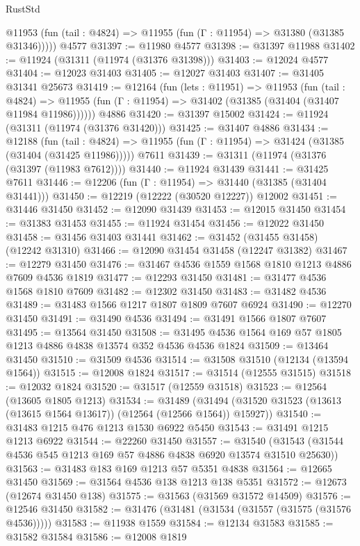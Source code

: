 \begin{lexlean}{RustStd}
\begin{coremodule}
{\begin{coremodule}
{{{{{{{{{{{{{{{{{{{{{{{{{{{{{{{{{{{{{{{{{{{{{{{{{{{{{{{{{{{{{{{{{{{{{{{{{{{{{{{{      @11953 (fun (tail : @4824) => @11955 (fun (Γ : @11954) => @31380 (@31385 @31346)))))
    @4577
@31397 := @11980 @4577
@31398 := @31397 @11988
@31402 := @11924 (@31311 (@11974 (@31376 @31398)))
@31403 := @12024 @4577
@31404 := @12023 @31403
@31405 := @12027 @31403
@31407 := @31405 @31341 @25673
@31419 := @12164
    (fun (lets : @11951) =>
    @11953
      (fun (tail : @4824) =>
      @11955 (fun (Γ : @11954) => @31402 (@31385 (@31404 (@31407 @11984 @11986))))))
    @4886
@31420 := @31397 @15002
@31424 := @11924 (@31311 (@11974 (@31376 @31420)))
@31425 := @31407 @4886
@31434 := @12188
    (fun (tail : @4824) => @11955 (fun (Γ : @11954) => @31424 (@31385 (@31404 (@31425 @11986)))))
    @7611
@31439 := @31311 (@11974 (@31376 (@31397 (@11983 @7612))))
@31440 := @11924 @31439
@31441 := @31425 @7611
@31446 := @12206 (fun (Γ : @11954) => @31440 (@31385 (@31404 @31441)))
@31450 := @12219 (@12222 (@30520 @12227)) @12002
@31451 := @31446 @31450
@31452 := @12090 @31439
@31453 := @12015 @31450
@31454 := @31383 @31453
@31455 := @11924 @31454
@31456 := @12022 @31450
@31458 := @31456 @31403 @31441
@31462 := @31452 (@31455 @31458) (@12242 @31310)
@31466 := @12090 @31454 @31458 (@12247 @31382)
@31467 := @12279 @31450
@31476 := @31467 @4536 @1559 @1568 @1810 @1213 @4886 @7609 @4536 @1819
@31477 := @12293 @31450
@31481 := @31477 @4536 @1568 @1810 @7609
@31482 := @12302 @31450
@31483 := @31482 @4536
@31489 := @31483 @1566 @1217 @1807 @1809 @7607 @6924
@31490 := @12270 @31450
@31491 := @31490 @4536
@31494 := @31491 @1566 @1807 @7607
@31495 := @13564 @31450
@31508 := @31495 @4536 @1564 @169 @57 @1805 @1213 @4886 @4838 @13574 @352 @4536 @4536 @1824
@31509 := @13464 @31450
@31510 := @31509 @4536
@31514 := @31508 @31510 (@12134 (@13594 @1564))
@31515 := @12008 @1824
@31517 := @31514 (@12555 @31515)
@31518 := @12032 @1824
@31520 := @31517 (@12559 @31518)
@31523 := @12564 (@13605 @1805 @1213)
@31534 := @31489
    (@31494 (@31520 @31523 (@13613 (@13615 @1564 @13617)) (@12564 (@12566 @1564)) @15927))
@31540 := @31483 @1215 @476 @1213 @1530 @6922 @5450
@31543 := @31491 @1215 @1213 @6922
@31544 := @22260 @31450
@31557 := @31540 (@31543 (@31544 @4536 @545 @1213 @169 @57 @4886 @4838 @6920 @13574 @31510 @25630))
@31563 := @31483 @183 @169 @1213 @57 @5351 @4838
@31564 := @12665 @31450
@31569 := @31564 @4536 @138 @1213 @138 @5351
@31572 := @12673 (@12674 @31450 @138)
@31575 := @31563 (@31569 @31572 @14509)
@31576 := @12546 @31450
@31582 := @31476 (@31481 (@31534 (@31557 (@31575 (@31576 @4536)))))
@31583 := @11938 @1559
@31584 := @12134 @31583
@31585 := @31582 @31584
@31586 := @12008 @1819
}}}}}}}}}}}}}}}}}}}}}}}}}}}}}}}}}}}}}}}}}}}}}}}}}}}}}}}}}}}}}}}}}}}}}}}}}}}}}}}}
\end{coremodule}}
\end{coremodule}
\end{lexlean}
